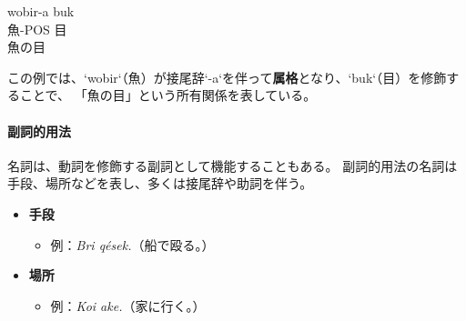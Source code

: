 \begin{exe}
\ex \gll wobir-a buk\\
    魚-POS 目 \\
\glt 魚の目
\end{exe}

この例では、`wobir`（魚）が接尾辞`-a`を伴って\textbf{属格}となり、`buk`（目）を修飾することで、
「魚の目」という所有関係を表している。


\paragraph{副詞的用法}
名詞は、動詞を修飾する副詞として機能することもある。
副詞的用法の名詞は手段、場所などを表し、多くは接尾辞や助詞を伴う。

\begin{itemize}
    \item \textbf{手段}
    \begin{itemize}
        \item 例：\textit{Bri q\'esek.}（船で殴る。）
    \end{itemize}

    \item \textbf{場所}
    \begin{itemize}
        \item 例：\textit{Koi ake.}（家に行く。）
    \end{itemize}
\end{itemize}